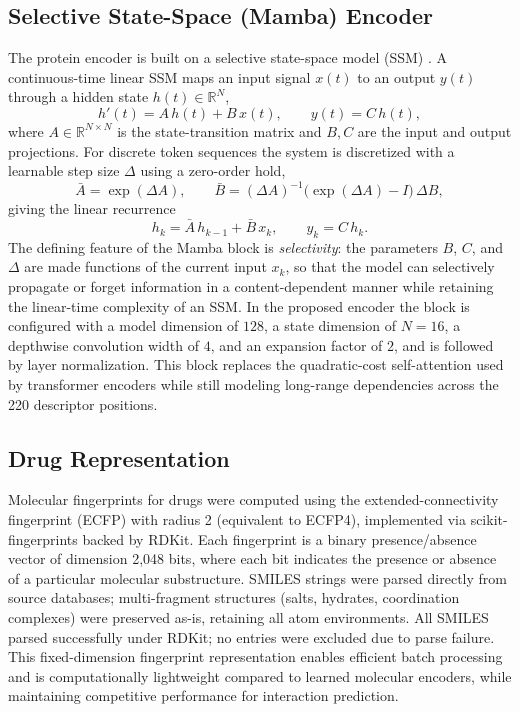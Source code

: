 \documentclass[conference]{IEEEtran}
\begin{document}
\subsection{Selective State-Space (Mamba) Encoder}
\label{sec:mamba}
The protein encoder is built on a selective state-space model (SSM)
\cite{ref_mamba}. A continuous-time linear SSM maps an input signal $x(t)$ to an
output $y(t)$ through a hidden state $h(t) \in \mathbb{R}^{N}$,
\begin{equation}
h'(t) = A\,h(t) + B\,x(t), \qquad y(t) = C\,h(t),
\label{eq:ssm-cont}
\end{equation}
where $A \in \mathbb{R}^{N \times N}$ is the state-transition matrix and $B, C$
are the input and output projections. For discrete token sequences the system
is discretized with a learnable step size $\Delta$ using a zero-order hold,
\begin{equation}
\bar{A} = \exp(\Delta A), \qquad
\bar{B} = (\Delta A)^{-1}\!\bigl(\exp(\Delta A) - I\bigr)\,\Delta B,
\label{eq:discretize}
\end{equation}
giving the linear recurrence
\begin{equation}
h_{k} = \bar{A}\,h_{k-1} + \bar{B}\,x_{k}, \qquad y_{k} = C\,h_{k}.
\label{eq:ssm-rec}
\end{equation}
The defining feature of the Mamba block is \emph{selectivity}: the parameters
$B$, $C$, and $\Delta$ are made functions of the current input $x_{k}$, so that
the model can selectively propagate or forget information in a content-dependent
manner while retaining the linear-time complexity of an SSM. In the proposed
encoder the block is configured with a model dimension of $128$, a state
dimension of $N = 16$, a depthwise convolution width of $4$, and an expansion
factor of $2$, and is followed by layer normalization. This block replaces the
quadratic-cost self-attention used by transformer encoders while still modeling
long-range dependencies across the 220 descriptor positions.

\subsection{Drug Representation}
Molecular fingerprints for drugs were computed using the extended-connectivity
fingerprint (ECFP) with radius 2 (equivalent to ECFP4), implemented via
scikit-fingerprints backed by RDKit. Each fingerprint is a binary presence/absence
vector of dimension 2{,}048 bits, where each bit indicates the presence or absence
of a particular molecular substructure. SMILES strings were parsed directly from
source databases; multi-fragment structures (salts, hydrates, coordination complexes)
were preserved as-is, retaining all atom environments. All SMILES parsed successfully
under RDKit; no entries were excluded due to parse failure. This fixed-dimension
fingerprint representation enables efficient batch processing and is computationally
lightweight compared to learned molecular encoders, while maintaining competitive
performance for interaction prediction.
\end{document}

